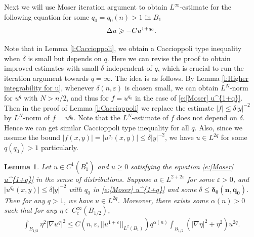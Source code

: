\documentclass[11pt,reqno]{amsart}
\numberwithin{equation}{section}
\newtheorem{lemma}[thm]{Lemma}
\theoremstyle{definition}
\theoremstyle{remark}
\begin{document}
Next we will use Moser iteration argument to obtain $L^{\infty}$-estimate for the following equation for some $q_0=q_0(n)>1$ in $B_1$
\begin{equation}\label{e:[Moser] u^{1+q}}
    \Delta u \geqslant - C u^{1+q_0}.
\end{equation}

Note that in Lemma \ref{l:Caccioppoli}, we obtain a Caccioppoli type inequality when $\delta$ is small but depends on $q$.  Here we can revise the
proof to obtain improved estimates with small $\delta$ independent of $q$, which is crucial to run the iteration argument towards $q=\infty$. The idea is as follows. By Lemma \ref{l:Higher integrability for u}, whenever $\delta(n,\varepsilon)$ is chosen small, we can obtain $L^N$-norm for $u^{q}$ with $N>n/2$, and thus for $f=u^{q_0}$ in the case of \eqref{e:[Moser] u^{1+q}}. Then in the proof of Lemma \ref{l:Caccioppoli} we replace the estimate $|f| \leqslant \delta|y|^{-2}$ by $L^N$-norm of $f=u^{q_0}$. Note that the $L^N$-estimate of $f$ does not depend on $\delta$. Hence we can get similar Caccioppoli type inequality for all $q$. Also, since we assume the bound $|f(x,y)| = |u^{q_0}(x,y)| \leqslant \delta |y|^{-2}$, we have $u \in L^{2q}$ for some $q(q_0)>1$ particularly.


\begin{lemma}\label{l:Cacchio-2}
    Let $u \in C^1(B_1^*)$ and $u \geqslant 0$ satisfying the equation \eqref{e:[Moser] u^{1+q}} in the sense of distributions. Suppose $u \in L^{2+2\varepsilon}$ for some $\varepsilon>0$, and $|u^{q_0}(x,y) | \leqslant \delta |y|^{-2}$ with $q_0$ in \eqref{e:[Moser] u^{1+q}} and some $\delta \leqslant \mathbf{\delta_0(n,q_0)}$. Then for any $q>1$, we have $u \in L^{2q}$. Moreover, there exists some $\alpha(n)>0$ such that for any $\eta \in C^{\infty}_c(B_{1/2})$,     \begin{align}\label{e:Caccip lemma 2}
    \int_{B_{1/2}} \eta^2 |\nabla u^q|^2 \leqslant C(n,\varepsilon,||u^{1+\varepsilon}||_{L^{2}(B_1)}) q^{\alpha(n)} \int_{B_{1/2}} (|\nabla \eta|^2 + \eta^2) u^{2q}.
    \end{align}
\end{lemma}
\end{document}

